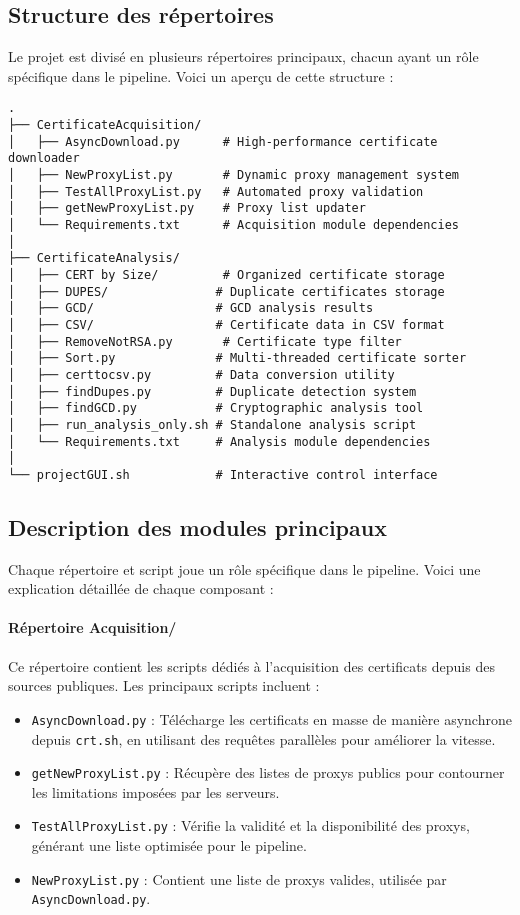 \documentclass[11pt,a4paper]{article}
\begin{document}
\subsection{Structure des répertoires}
Le projet est divisé en plusieurs répertoires principaux, chacun ayant un rôle spécifique dans le pipeline. Voici un aperçu de cette structure :
\begin{lstlisting}[basicstyle=\small]
.
├── CertificateAcquisition/
│   ├── AsyncDownload.py      # High-performance certificate downloader
│   ├── NewProxyList.py       # Dynamic proxy management system
│   ├── TestAllProxyList.py   # Automated proxy validation
│   ├── getNewProxyList.py    # Proxy list updater
│   └── Requirements.txt      # Acquisition module dependencies
│
├── CertificateAnalysis/
│   ├── CERT by Size/         # Organized certificate storage
│   ├── DUPES/               # Duplicate certificates storage
│   ├── GCD/                 # GCD analysis results
│   ├── CSV/                 # Certificate data in CSV format
│   ├── RemoveNotRSA.py       # Certificate type filter
│   ├── Sort.py              # Multi-threaded certificate sorter
│   ├── certtocsv.py         # Data conversion utility
│   ├── findDupes.py         # Duplicate detection system
│   ├── findGCD.py           # Cryptographic analysis tool
│   ├── run_analysis_only.sh # Standalone analysis script
│   └── Requirements.txt     # Analysis module dependencies
│
└── projectGUI.sh            # Interactive control interface

\end{lstlisting}

\subsection{Description des modules principaux}
Chaque répertoire et script joue un rôle spécifique dans le pipeline. Voici une explication détaillée de chaque composant :

\paragraph{Répertoire Acquisition/}
Ce répertoire contient les scripts dédiés à l'acquisition des certificats depuis des sources publiques. Les principaux scripts incluent :
\begin{itemize}
    \item \texttt{AsyncDownload.py} : Télécharge les certificats en masse de manière asynchrone depuis \texttt{crt.sh}, en utilisant des requêtes parallèles pour améliorer la vitesse.
    \item \texttt{getNewProxyList.py} : Récupère des listes de proxys publics pour contourner les limitations imposées par les serveurs.
    \item \texttt{TestAllProxyList.py} : Vérifie la validité et la disponibilité des proxys, générant une liste optimisée pour le pipeline.
    \item \texttt{NewProxyList.py} : Contient une liste de proxys valides, utilisée par \texttt{AsyncDownload.py}.
\end{itemize}
\end{document}
